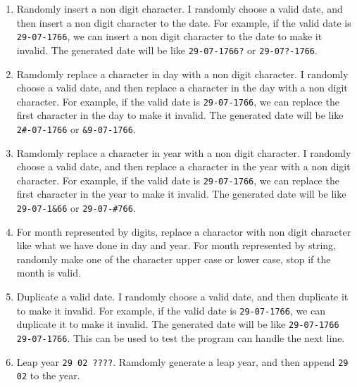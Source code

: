 \documentclass[a4paper,12pt]{article} %
\begin{document}
\begin{enumerate}
        \texttt{'\textasciitilde'}, \texttt{'\textasciigrave'}, \texttt{'\textasciicircum'}, \texttt{'\textasciitilde'}, 
        \texttt{'\textasciigrave'}, \texttt{'\textasciicircum'}, \texttt{'\textasciitilde'}, \texttt{'\textasciigrave'},
    \item Randomly insert a non digit character. I randomly choose a valid date, and then insert a non digit character to the date.
        For example, if the valid date is \texttt{29-07-1766}, we can insert a non digit character to the date to make it invalid.
        The generated date will be like \texttt{29-07-1766?} or \texttt{29-07?-1766}.
    \item Ramdomly replace a character in day with a non digit character. I randomly choose a valid date, and then replace a character in the day with a non digit character.
        For example, if the valid date is \texttt{29-07-1766}, we can replace the first character in the day to make it invalid.
        The generated date will be like \texttt{2\#-07-1766} or \texttt{\&9-07-1766}.
    \item Ramdomly replace a character in year with a non digit character. I randomly choose a valid date, and then replace a character in the year with a non digit character.
        For example, if the valid date is \texttt{29-07-1766}, we can replace the first character in the year to make it invalid.
        The generated date will be like \texttt{29-07-1\&66} or \texttt{29-07-\#766}.
    \item For month represented by digits, replace a charactor with non digit character like what we have done in day and year.
        For month represented by string, randomly make one of the character upper case or lower case, stop if the month is valid.
    \item Duplicate a valid date. I randomly choose a valid date, and then duplicate it to make it invalid.
        For example, if the valid date is \texttt{29-07-1766}, we can duplicate it to make it invalid.
        The generated date will be like \texttt{29-07-1766 29-07-1766}. This can be used to test the program can handle the next line.
    \item Leap year \texttt{29 02 ????}. Ramdomly generate a leap year, and then append \texttt{29 02} to the year.
    
\end{enumerate}

\end{document}
